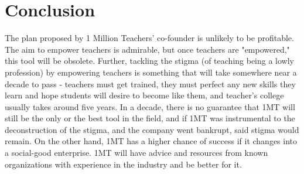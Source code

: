 \documentclass[letterpaper]{article}
\begin{document}
\section{Conclusion}

    The plan proposed by 1 Million Teachers' co-founder is unlikely to be profitable. The aim to empower teachers is admirable, but once teachers are "empowered," this tool will be obsolete. Further, tackling the stigma (of teaching being a lowly profession) by empowering teachers is something that will take somewhere near a decade to pass - teachers must get trained, they must perfect any new skills they learn and hope students will desire to become like them, and teacher's college usually takes around five years. In a decade, there is no guarantee that 1MT will still be the only or the best tool in the field, and if 1MT was instrumental to the deconstruction of the stigma, and the company went bankrupt, said stigma would remain. On the other hand, 1MT has a higher chance of success if it changes into a social-good enterprise. 1MT will have advice and resources from known organizations with experience in the industry and be better for it.


\medskip

\cleardoublepage
\printbibliography
\end{document}
